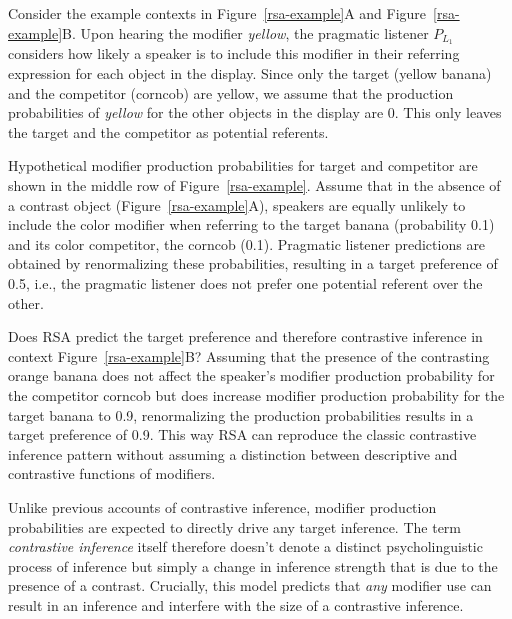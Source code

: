 \documentclass[a4paper,man,floatsintext,natbib]{apa6}
\newcommand{\figref}[1]{Figure~\ref{#1}}
\begin{document}
Consider the example contexts in \figref{rsa-example}A and \figref{rsa-example}B. Upon hearing the modifier \textit{yellow}, the pragmatic listener $P_{L_1}$ considers how likely a speaker is to include this modifier in their referring expression for each object in the display. Since only the target (yellow banana) and the competitor (corncob) are yellow, we assume that the production probabilities of \textit{yellow} for the other objects in the display are 0. This only leaves the target and the competitor as potential referents. 

Hypothetical modifier production probabilities for target and competitor are shown in the middle row of \figref{rsa-example}. 
Assume that in the absence of a contrast object (\figref{rsa-example}A), speakers are equally unlikely to include the color modifier when referring to the target banana (probability 0.1) and its color competitor, the corncob (0.1). Pragmatic listener predictions are obtained by renormalizing these probabilities, resulting in a target preference of 0.5, i.e., the pragmatic listener does not prefer one potential referent over the other.

Does RSA predict the target preference and therefore contrastive inference in context \figref{rsa-example}B? Assuming that the presence of the contrasting orange banana does not affect the speaker's modifier production probability for the competitor corncob but does increase modifier production probability for the target banana to 0.9, renormalizing the production probabilities results in a target preference of 0.9. This way RSA can reproduce the classic contrastive inference pattern without assuming a distinction between descriptive and contrastive functions of modifiers.

Unlike previous accounts of contrastive inference, modifier production probabilities are expected to directly drive any target inference. The term \emph{contrastive inference} itself therefore doesn't denote a distinct psycholinguistic process of inference but simply a change in inference strength that is due to the presence of a contrast.
Crucially, this model predicts that \emph{any} modifier use can result in an inference and interfere with the size of a contrastive inference. 
\end{document}
